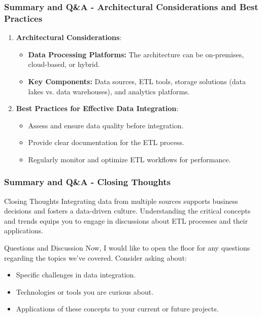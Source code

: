 \documentclass[aspectratio=169]{beamer}
\begin{document}
\begin{frame}[fragile]
    \frametitle{Summary and Q\&A - Architectural Considerations and Best Practices}
    
    \begin{enumerate}[resume]
        \item \textbf{Architectural Considerations}:
        \begin{itemize}
            \item \textbf{Data Processing Platforms:} The architecture can be on-premises, cloud-based, or hybrid.
            \item \textbf{Key Components:} Data sources, ETL tools, storage solutions (data lakes vs. data warehouses), and analytics platforms.
        \end{itemize}

        \item \textbf{Best Practices for Effective Data Integration}:
        \begin{itemize}
            \item Assess and ensure data quality before integration.
            \item Provide clear documentation for the ETL process.
            \item Regularly monitor and optimize ETL workflows for performance.
        \end{itemize}
    \end{enumerate}
\end{frame}

\begin{frame}[fragile]
    \frametitle{Summary and Q\&A - Closing Thoughts}
    
    \begin{block}{Closing Thoughts}
        Integrating data from multiple sources supports business decisions and fosters a data-driven culture. Understanding the critical concepts and trends equips you to engage in discussions about ETL processes and their applications.
    \end{block}
    
    \begin{block}{Questions and Discussion}
        Now, I would like to open the floor for any questions regarding the topics we've covered. Consider asking about:
        \begin{itemize}
            \item Specific challenges in data integration.
            \item Technologies or tools you are curious about.
            \item Applications of these concepts to your current or future projects.
        \end{itemize}
    \end{block}
\end{frame}
\end{document}
